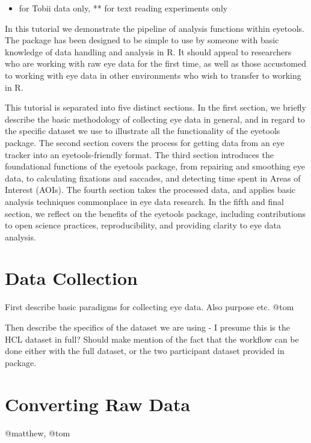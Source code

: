\documentclass[
  man,
  floatsintext,
  longtable,
  nolmodern,
  notxfonts,
  notimes,
  colorlinks=true,linkcolor=blue,citecolor=blue,urlcolor=blue]{apa7}
\providecommand{\tightlist}{%
  \setlength{\itemsep}{0pt}\setlength{\parskip}{0pt}}
\begin{document}
\begin{itemize}
\tightlist
\item
  for Tobii data only, ** for text reading experiments only
\end{itemize}

In this tutorial we demonstrate the pipeline of analysis functions
within eyetools. The package has been designed to be simple to use by
someone with basic knowledge of data handling and analysis in R. It
should appeal to researchers who are working with raw eye data for the
first time, as well as those accustomed to working with eye data in
other environments who wish to transfer to working in R.

This tutorial is separated into five distinct sections. In the first
section, we briefly describe the basic methodology of collecting eye
data in general, and in regard to the specific dataset we use to
illustrate all the functionality of the eyetools package. The second
section covers the process for getting data from an eye tracker into an
eyetools-friendly format. The third section introduces the foundational
functions of the eyetools package, from repairing and smoothing eye
data, to calculating fixations and saccades, and detecting time spent in
Areas of Interest (AOIs). The fourth section takes the processed data,
and applies basic analysis techniques commonplace in eye data research.
In the fifth and final section, we reflect on the benefits of the
eyetools package, including contributions to open science practices,
reproducibility, and providing clarity to eye data analysis.

\section{Data Collection}\label{data-collection}

First describe basic paradigms for collecting eye data. Also purpose
etc. @tom

Then describe the specifics of the dataset we are using - I presume this
is the HCL dataset in full? Should make mention of the fact that the
workflow can be done either with the full dataset, or the two
participant dataset provided in package.

\section{Converting Raw Data}\label{converting-raw-data}

@matthew, @tom
\end{document}
